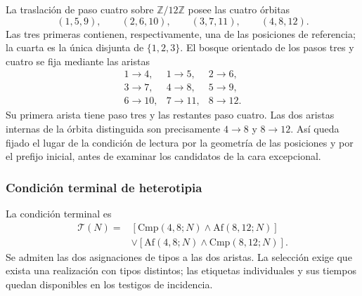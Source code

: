 La traslación de paso cuatro sobre $\mathbb Z/12\mathbb Z$ posee las
cuatro órbitas
\[
 (1,5,9),\qquad(2,6,10),\qquad(3,7,11),\qquad(4,8,12).
\]
Las tres primeras contienen, respectivamente, una de las posiciones de
referencia; la cuarta es la única disjunta de $\{1,2,3\}$. El bosque
orientado de los pasos tres y cuatro se fija mediante las aristas
\[
 \begin{array}{lll}
 1\to4,&1\to5,&2\to6,\\
 3\to7,&4\to8,&5\to9,\\
 6\to10,&7\to11,&8\to12.
 \end{array}
\]
Su primera arista tiene paso tres y las restantes paso cuatro. Las dos
aristas internas de la órbita distinguida son precisamente
$4\to8$ y $8\to12$. Así queda fijado el lugar de la condición de
lectura por la geometría de las posiciones y por el prefijo inicial,
antes de examinar los candidatos de la cara excepcional.

\subsubsection{Condición terminal de heterotipia}

La condición terminal es
\begin{equation}
 \begin{split}
 \mathcal T(N)={}&
 [\mathrm{Cmp}(4,8;N)\wedge\mathrm{Af}(8,12;N)]\\
 &\vee[\mathrm{Af}(4,8;N)\wedge\mathrm{Cmp}(8,12;N)].
 \end{split}
 \label{act21:eq:kdes-heterotipia}
\end{equation}
Se admiten las dos asignaciones de tipos a las dos aristas. La
selección exige que exista una realización con tipos distintos; las
etiquetas individuales y sus tiempos quedan disponibles en los
testigos de incidencia.


